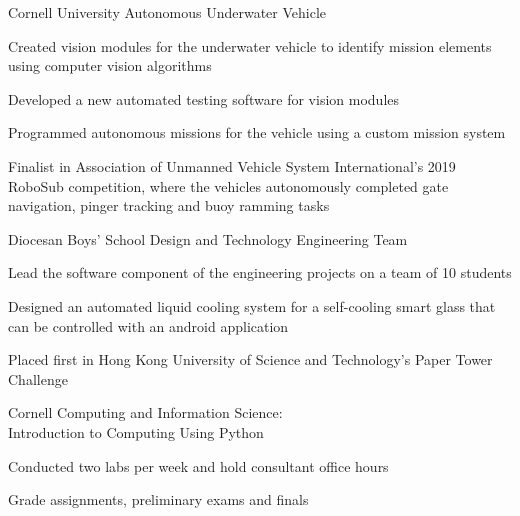 \documentclass{resume}
\begin{document}
\begin{experience}
    \begin{entryleft}{Cornell University Autonomous Underwater Vehicle}{}
        \begin{description}
            \item Created vision modules for the underwater vehicle to identify mission elements using computer vision algorithms
            \item Developed a new automated testing software for vision modules
            \item Programmed autonomous missions for the vehicle using a custom mission system
            \item Finalist in Association of Unmanned Vehicle System International's 2019 RoboSub competition, where the vehicles autonomously completed gate navigation, pinger tracking and buoy ramming tasks
        \end{description}
    \end{entryleft}
    \begin{entryright}
    \end{entryright}

    \begin{entryleft}{Diocesan Boys' School Design and Technology Engineering Team}{}
        \begin{description}
            \item Lead the software component of the engineering projects on a team of 10 students
            \item Designed an automated liquid cooling system for a self-cooling smart glass that can be controlled with an android application
            \item Placed first in Hong Kong University of Science and Technology's Paper Tower Challenge
        \end{description}
    \end{entryleft}
    \begin{entryright}
    \end{entryright}

    \begin{entryleft}{Cornell Computing and Information Science: \\ Introduction to Computing Using Python}{}
        \begin{description}
            \item Conducted two labs per week and hold consultant office hours
            \item Grade assignments, preliminary exams and finals
        \end{description}
    \end{entryleft}
    \begin{entryright}
    \end{entryright}
\end{experience}
\end{document}
